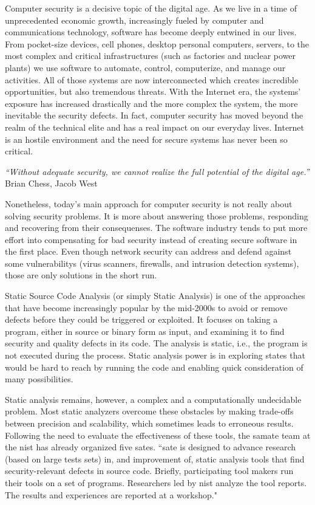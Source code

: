 Computer security is a decisive topic of the digital age. As we live in a time of unprecedented economic growth, increasingly fueled by computer and communications technology, software has become deeply entwined in our lives. From pocket-size devices, cell phones, desktop personal computers, servers, to the most complex and critical infrastructures (such as factories and nuclear power plants) we use software to automate, control, computerize, and manage our activities. All of those systems are now interconnected which creates incredible opportunities, but also tremendous threats. With the Internet era, the systems' exposure has increased drastically and the more complex the system, the more inevitable the security defects. In fact, computer security has moved beyond the realm of the technical elite and has a real impact on our everyday lives. Internet is an hostile environment and the need for secure systems has never been so critical.

\begin{flushright}
    \emph{``Without adequate security, we cannot realize the full potential of the digital age.''\\}
    \cite{chess2007secure} Brian Chess, Jacob West
\end{flushright}

Nonetheless, today's main approach for computer security is not really about solving security problems. It is more about answering those problems, responding and recovering from their consequenses. The software industry tends to put more effort into compensating for bad security instead of creating secure software in the first place. Even though network security can address and defend against some \glspl{vulnerability} (virus scanners, firewalls, and intrusion detection systems), those are only solutions in the short run.

Static Source Code Analysis (or simply Static Analysis) is one of the approaches that have become increasingly popular by the mid-2000s to avoid or remove defects before they could be triggered or exploited. It focuses on taking a program, either in source or binary form as input, and examining it to find security and quality defects in its code. The analysis is static, i.e., the program is not executed during the process. Static analysis power is in exploring states that would be hard to reach by running the code and enabling quick consideration of many possibilities.

Static analysis remains, however, a complex and a computationally undecidable problem. Most static analyzers overcome these obstacles by making trade-offs between precision and scalability, which sometimes leads to erroneous results. Following the need to evaluate the effectiveness of these tools, the \gls{samate} team at the \gls{nist} has already organized five \glspl{sate}. ``\gls{sate} is designed to advance research (based on large tests sets) in, and improvement of, static analysis tools that find security-relevant defects in source code. Briefly, participating tool makers run their tools on a set of programs. Researchers led by \gls{nist} analyze the tool reports. The results and experiences are reported at a workshop."

